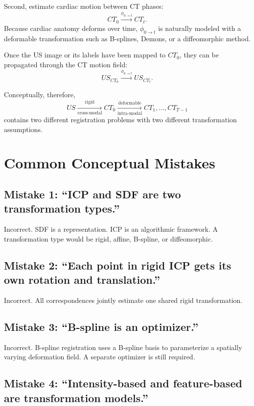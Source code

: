 \documentclass[11pt,a4paper]{article}
\begin{document}
Second, estimate cardiac motion between CT phases:
\[
CT_0
\xrightarrow{\phi_{0\to t}}
CT_t.
\]
Because cardiac anatomy deforms over time, $\phi_{0\to t}$ is naturally modeled with a deformable transformation such as B-splines, Demons, or a diffeomorphic method.

Once the US image or its labels have been mapped to $CT_0$, they can be propagated through the CT motion field:
\[
US_{CT_0}
\xrightarrow{\phi_{0\to t}}
US_{CT_t}.
\]

Conceptually, therefore,
\[
\boxed{
US
\xrightarrow[\text{cross-modal}]{\text{rigid}}
CT_0
\xrightarrow[\text{intra-modal}]{\text{deformable}}
CT_1,\ldots,CT_{T-1}
}
\]
contains two different registration problems with two different transformation assumptions.

\section{Common Conceptual Mistakes}

\subsection{Mistake 1: ``ICP and SDF are two transformation types.''}

Incorrect. SDF is a representation. ICP is an algorithmic framework. A transformation type would be rigid, affine, B-spline, or diffeomorphic.

\subsection{Mistake 2: ``Each point in rigid ICP gets its own rotation and translation.''}

Incorrect. All correspondences jointly estimate one shared rigid transformation.

\subsection{Mistake 3: ``B-spline is an optimizer.''}

Incorrect. B-spline registration uses a B-spline basis to parameterize a spatially varying deformation field. A separate optimizer is still required.

\subsection{Mistake 4: ``Intensity-based and feature-based are transformation models.''}
\end{document}
